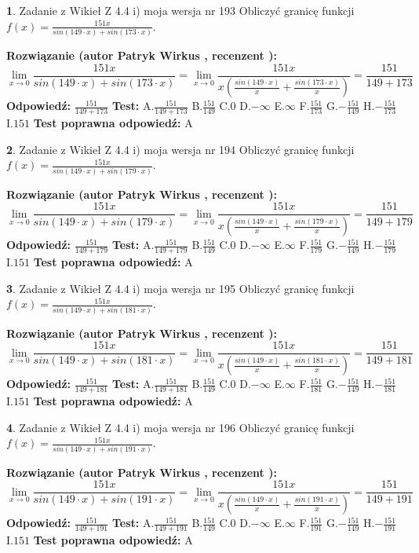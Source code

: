\documentclass[12pt, a4paper]{article}
\theoremstyle{definition} %
\newtheorem{zad}{}
\newcommand{\zadStart}[1]{\begin{zad}#1\newline}
\newcommand{\zadStop}{\end{zad}}
\newcommand{\rozwStart}[2]{\noindent \textbf{Rozwiązanie (autor #1 , recenzent #2): }\newline}
\newcommand{\rozwStop}{\newline}
\newcommand{\odpStart}{\noindent \textbf{Odpowiedź:}\newline}
\newcommand{\odpStop}{\newline}
\newcommand{\testStart}{\noindent \textbf{Test:}\newline}
\newcommand{\testStop}{\newline}
\newcommand{\kluczStart}{\noindent \textbf{Test poprawna odpowiedź:}\newline}
\newcommand{\kluczStop}{\newline}
\begin{document}
\zadStart{Zadanie z Wikieł Z 4.4 i) moja wersja nr 193}
Obliczyć granicę funkcji $f(x)=\frac{151x}{sin(149\cdot x) +sin(173\cdot x)}$.
\zadStop
\rozwStart{Patryk Wirkus}{}
$$\lim\limits_{x\to 0}\frac{151x}{sin(149\cdot x) +sin(173\cdot x)}=\lim\limits_{x\to 0}\frac{151x}{x(\frac{sin(149\cdot x)}{x}+\frac{sin(173\cdot x)}{x})}=\frac{151}{149+173}$$
\rozwStop
\odpStart
$\frac{151}{149+173}$
\odpStop
\testStart
A.$\frac{151}{149+173}$
B.$\frac{151}{149}$
C.$0$
D.$-\infty$
E.$\infty$
F.$\frac{151}{173}$
G.$-\frac{151}{149}$
H.$-\frac{151}{173}$
I.$151$
\testStop
\kluczStart
A
\kluczStop



\zadStart{Zadanie z Wikieł Z 4.4 i) moja wersja nr 194}
Obliczyć granicę funkcji $f(x)=\frac{151x}{sin(149\cdot x) +sin(179\cdot x)}$.
\zadStop
\rozwStart{Patryk Wirkus}{}
$$\lim\limits_{x\to 0}\frac{151x}{sin(149\cdot x) +sin(179\cdot x)}=\lim\limits_{x\to 0}\frac{151x}{x(\frac{sin(149\cdot x)}{x}+\frac{sin(179\cdot x)}{x})}=\frac{151}{149+179}$$
\rozwStop
\odpStart
$\frac{151}{149+179}$
\odpStop
\testStart
A.$\frac{151}{149+179}$
B.$\frac{151}{149}$
C.$0$
D.$-\infty$
E.$\infty$
F.$\frac{151}{179}$
G.$-\frac{151}{149}$
H.$-\frac{151}{179}$
I.$151$
\testStop
\kluczStart
A
\kluczStop



\zadStart{Zadanie z Wikieł Z 4.4 i) moja wersja nr 195}
Obliczyć granicę funkcji $f(x)=\frac{151x}{sin(149\cdot x) +sin(181\cdot x)}$.
\zadStop
\rozwStart{Patryk Wirkus}{}
$$\lim\limits_{x\to 0}\frac{151x}{sin(149\cdot x) +sin(181\cdot x)}=\lim\limits_{x\to 0}\frac{151x}{x(\frac{sin(149\cdot x)}{x}+\frac{sin(181\cdot x)}{x})}=\frac{151}{149+181}$$
\rozwStop
\odpStart
$\frac{151}{149+181}$
\odpStop
\testStart
A.$\frac{151}{149+181}$
B.$\frac{151}{149}$
C.$0$
D.$-\infty$
E.$\infty$
F.$\frac{151}{181}$
G.$-\frac{151}{149}$
H.$-\frac{151}{181}$
I.$151$
\testStop
\kluczStart
A
\kluczStop



\zadStart{Zadanie z Wikieł Z 4.4 i) moja wersja nr 196}
Obliczyć granicę funkcji $f(x)=\frac{151x}{sin(149\cdot x) +sin(191\cdot x)}$.
\zadStop
\rozwStart{Patryk Wirkus}{}
$$\lim\limits_{x\to 0}\frac{151x}{sin(149\cdot x) +sin(191\cdot x)}=\lim\limits_{x\to 0}\frac{151x}{x(\frac{sin(149\cdot x)}{x}+\frac{sin(191\cdot x)}{x})}=\frac{151}{149+191}$$
\rozwStop
\odpStart
$\frac{151}{149+191}$
\odpStop
\testStart
A.$\frac{151}{149+191}$
B.$\frac{151}{149}$
C.$0$
D.$-\infty$
E.$\infty$
F.$\frac{151}{191}$
G.$-\frac{151}{149}$
H.$-\frac{151}{191}$
I.$151$
\testStop
\kluczStart
A
\kluczStop
\end{document}
